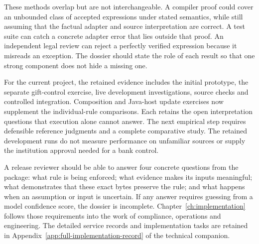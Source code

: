 These methods overlap but are not interchangeable. A compiler proof could cover
an unbounded class of accepted expressions under stated semantics, while still
assuming that the factual adapter and source interpretation are correct. A test
suite can catch a concrete adapter error that lies outside that proof. An
independent legal review can reject a perfectly verified expression because it
misreads an exception. The dossier should state the role of each result so that
one strong component does not hide a missing one.


For the current project, the retained evidence includes the initial prototype,
the separate gift-control exercise, live development investigations, source
checks and controlled integration. Composition and Java-host update exercises
now supplement the individual-rule comparisons. Each retains the open
interpretation questions that execution alone cannot answer. The next empirical
step requires defensible reference judgments and a complete comparative study.
The retained development runs do not measure performance on unfamiliar sources
or supply the institution approval needed for a bank control.

A release reviewer should be able to answer four concrete questions from the
package: what rule is being enforced; what evidence makes its inputs meaningful;
what demonstrates that these exact bytes preserve the rule; and what happens when
an assumption or input is uncertain. If any answer requires guessing from a model
confidence score, the dossier is incomplete. Chapter~\ref{ch:implementation} follows those requirements into the work of
compliance, operations and engineering. The detailed service records and
implementation tasks are retained in Appendix~\ref{app:full-implementation-record} of the technical companion.
